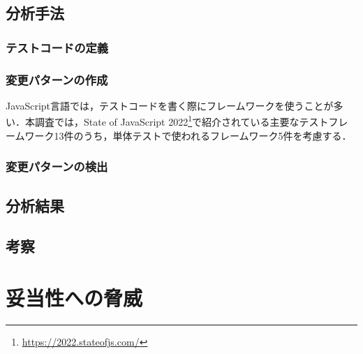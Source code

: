 \documentclass[11pt,dvipdfmx]{jreport}
\begin{document}





\section{分析手法}

\subsection{テストコードの定義}

\subsection{変更パターンの作成}
JavaScript言語では，テストコードを書く際にフレームワークを使うことが多い．本調査では，State of JavaScript 2022\footnote{\url{https://2022.stateofjs.com/}}で紹介されている主要なテストフレームワーク13件のうち，単体テストで使われるフレームワーク5件を考慮する．

\subsection{変更パターンの検出}

\section{分析結果}

\section{考察}

\chapter{妥当性への脅威}
\end{document}
